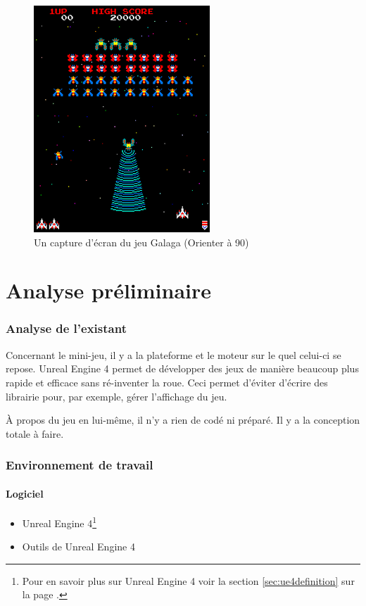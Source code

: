 \documentclass[11pt, a4paper, oneside]{article}
\begin{document}
\begin{figure}[h]
	\begin{center}
	\includegraphics[scale=0.8, angle=90]{Galaga}
	\caption{Un capture d'écran du jeu Galaga (Orienter à 90\degre)}
	\end{center}
\end{figure}

\newpage
\part{Analyse préliminaire}
\section{Analyse de l'existant}
Concernant le mini-jeu, il y a la plateforme et le moteur sur le quel celui-ci se repose. Unreal Engine 4 permet de développer des jeux de manière beaucoup plus rapide et efficace sans ré-inventer la roue. Ceci permet d'éviter d'écrire des librairie pour, par exemple, gérer l'affichage du jeu.

À propos du jeu en lui-même, il n'y a rien de codé ni préparé. Il y a la conception totale à faire.
\section{Environnement de travail}
\subsection{Logiciel}
\begin{itemize}
\item Unreal Engine 4\footnote{Pour en savoir plus sur Unreal Engine 4 voir la section \ref{sec:ue4definition} sur la page \pageref{sec:ue4definition}.}
\item Outils de Unreal Engine 4\\
\end{itemize}
\end{document}
